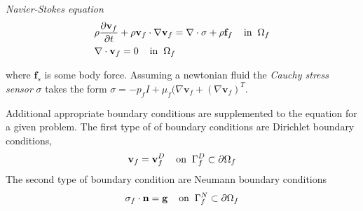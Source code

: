 \begin{equat}
\textit{Navier-Stokes equation}
\begin{align}
&\rho \frac{\partial \mathbf{v}_f}{\partial t} + \rho \mathbf{v}_f \cdot \nabla \mathbf{v}_f =
\nabla \cdot \sigma + \rho \mathbf{f}_f \hspace{4mm} \text{in} \hspace{2mm} \Omega_f \\
&\nabla \cdot \mathbf{v}_f = 0 \hspace{4mm} \text{in} \hspace{2mm} \Omega_f 
\end{align} 
\end{equat}
where $\mathbf{f}_s$ is some body force. 
Assuming a newtonian fluid the \textit{Cauchy stress sensor} $\sigma$ takes the form \newline $\sigma = -p_f I + \mu_f (\nabla \mathbf{v}_f + (\nabla \mathbf{v}_f)^T$.

Additional appropriate boundary conditions are supplemented to the equation for a given problem. The first type of of boundary conditions are Dirichlet boundary conditions, 
\begin{align}
\mathbf{v}_f = \mathbf{v}_f^D 
\hspace{4mm} \text{on} \hspace{2mm} \Gamma_f^D \subset \partial \Omega_f 
\end{align}
The second type of boundary condition are Neumann boundary conditions
\begin{align}
\sigma_f \cdot \mathbf{n} = \mathbf{g} 
\hspace{4mm} \text{on} \hspace{2mm} \Gamma_f^N \subset \partial \Omega_f 
\end{align}

\newpage
